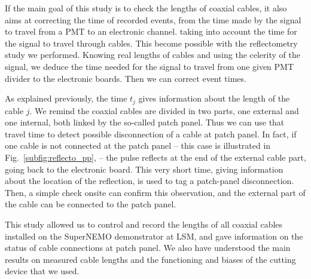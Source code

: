 If the main goal of this study is to check the lengths of coaxial cables, it also aims at correcting the time of recorded events, from the time made by the signal to travel from a PMT to an electronic channel.
taking into account the time for the signal to travel through cables.
This become possible with the reflectometry study we performed.
Knowing real lengths of cables and using the celerity of the signal, we deduce the time needed for the signal to travel from one given PMT divider to the electronic boards.
Then we can correct event times.

As explained previously, the time $t_{j}$ gives information about the length of the cable $j$.
We remind the coaxial cables are divided in two parts, one external and one internal, both linked by the so-called patch panel.
Thus we can use that travel time to detect possible disconnection of a cable at patch panel.
In fact, if one cable is not connected at the patch panel -- this case is illustrated in Fig.~\ref{subfig:reflecto_pp}, -- the pulse reflects at the end of the external cable part, going back to the electronic board.
This very short time, giving information about the location of the reflection, is used to tag a patch-panel disconnection.
Then, a simple check onsite can confirm this observation, and the external part of the cable can be connected to the patch panel.

This study allowed us to control and record the lengths of all coaxial cables installed on the SuperNEMO demonstrator at LSM, and gave information on the status of cable connections at patch panel.
We also have understood the main results on measured cable lengths and the functioning and biases of the cutting device that we used.

